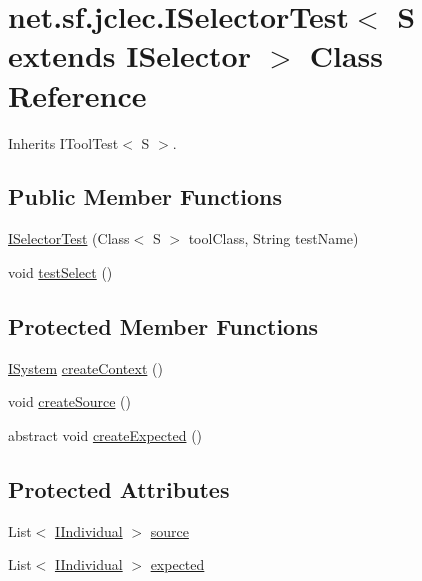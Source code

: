 \hypertarget{classnet_1_1sf_1_1jclec_1_1_i_selector_test_3_01_s_01extends_01_i_selector_01_4}{\section{net.\-sf.\-jclec.\-I\-Selector\-Test$<$ S extends I\-Selector $>$ Class Reference}
\label{classnet_1_1sf_1_1jclec_1_1_i_selector_test_3_01_s_01extends_01_i_selector_01_4}
}


Inherits I\-Tool\-Test$<$ S $>$.

\subsection*{Public Member Functions}
\begin{DoxyCompactItemize}
\item 
\hyperlink{classnet_1_1sf_1_1jclec_1_1_i_selector_test_3_01_s_01extends_01_i_selector_01_4_a62183b43b85eaf6240c7e79ebc5d5537}{I\-Selector\-Test} (Class$<$ S $>$ tool\-Class, String test\-Name)
\item 
void \hyperlink{classnet_1_1sf_1_1jclec_1_1_i_selector_test_3_01_s_01extends_01_i_selector_01_4_a250ea687fa2e41bdddfc0aefff0d2856}{test\-Select} ()
\end{DoxyCompactItemize}
\subsection*{Protected Member Functions}
\begin{DoxyCompactItemize}
\item 
\hyperlink{interfacenet_1_1sf_1_1jclec_1_1_i_system}{I\-System} \hyperlink{classnet_1_1sf_1_1jclec_1_1_i_selector_test_3_01_s_01extends_01_i_selector_01_4_abfa41360012857fde60e8654f237f492}{create\-Context} ()
\item 
void \hyperlink{classnet_1_1sf_1_1jclec_1_1_i_selector_test_3_01_s_01extends_01_i_selector_01_4_a70cd7150a7fa4226763fc7a302fa8fe2}{create\-Source} ()
\item 
abstract void \hyperlink{classnet_1_1sf_1_1jclec_1_1_i_selector_test_3_01_s_01extends_01_i_selector_01_4_a44d9e1cbe948f4f40cbb4dc399aba842}{create\-Expected} ()
\end{DoxyCompactItemize}
\subsection*{Protected Attributes}
\begin{DoxyCompactItemize}
\item 
List$<$ \hyperlink{interfacenet_1_1sf_1_1jclec_1_1_i_individual}{I\-Individual} $>$ \hyperlink{classnet_1_1sf_1_1jclec_1_1_i_selector_test_3_01_s_01extends_01_i_selector_01_4_a81260330632552e86e63da08b23bbf99}{source}
\item 
List$<$ \hyperlink{interfacenet_1_1sf_1_1jclec_1_1_i_individual}{I\-Individual} $>$ \hyperlink{classnet_1_1sf_1_1jclec_1_1_i_selector_test_3_01_s_01extends_01_i_selector_01_4_a0d5e22fffea96c580353be00c241a56d}{expected}
\end{DoxyCompactItemize}


